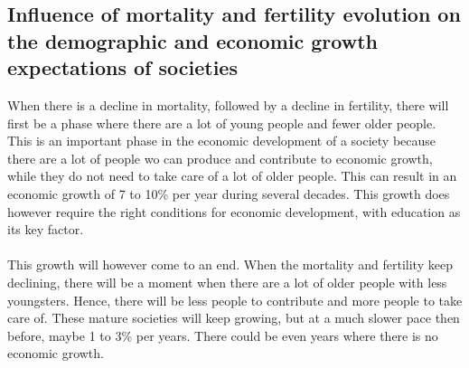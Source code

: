 \documentclass[../summary.tex]{subfiles}
\begin{document}
	\subsection{Influence of mortality and fertility evolution on the demographic and economic growth expectations of societies}
	When there is a decline in mortality, followed by a decline in fertility, there will first be a phase where there are a lot of young people and fewer older people. This is an important phase in the economic development of a society because there are a lot of people wo can produce and contribute to economic growth, while they do not need to take care of a lot of older people. This can result in an economic growth of 7 to 10\% per year during several decades. This growth does however require the right conditions for economic development, with education as its key factor.
	\\
	\\
	This growth will however come to an end. When the mortality and fertility keep declining, there will be a moment when there are a lot of older people with less youngsters. Hence, there will be less people to contribute and more people to take care of. These mature societies will keep growing, but at a much slower pace then before, maybe 1 to 3\% per years. There could be even years where there is no economic growth.
	
\end{document}
